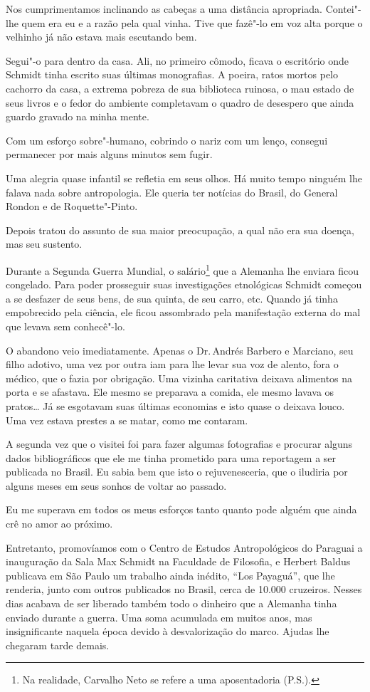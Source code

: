 {Nos cumprimentamos inclinando as cabeças a uma distância apropriada.
Contei"-lhe quem era eu e a razão pela qual vinha. Tive que fazê"-lo em
voz alta porque o velhinho já não estava mais escutando bem.

Segui"-o para dentro da casa. Ali, no primeiro cômodo, ficava o
escritório onde Schmidt tinha escrito suas últimas monografias. A
poeira, ratos mortos pelo cachorro da casa, a extrema pobreza de sua
biblioteca ruinosa, o mau estado de seus livros e o fedor do ambiente
completavam o quadro de desespero que ainda guardo gravado na minha
mente.

Com um esforço sobre"-humano, cobrindo o nariz com um lenço, consegui
permanecer por mais alguns minutos sem fugir.

Uma alegria quase infantil se refletia em seus olhos. Há muito tempo
ninguém lhe falava nada sobre antropologia. Ele queria ter notícias do
Brasil, do General Rondon e de Roquette"-Pinto.

Depois tratou do assunto de sua maior preocupação, a qual não era sua
doença, mas seu sustento.

Durante a Segunda Guerra Mundial, o salário\footnote{Na realidade,
  Carvalho Neto se refere a uma aposentadoria (P.S.).} que a Alemanha
lhe enviara ficou congelado. Para poder prosseguir suas investigações
etnológicas Schmidt começou a se desfazer de seus bens, de sua quinta,
de seu carro, etc. Quando já tinha empobrecido pela ciência, ele ficou
assombrado pela manifestação externa do mal que levava sem conhecê"-lo.

O abandono veio imediatamente. Apenas o Dr.\,Andrés Barbero e Marciano,
seu filho adotivo, uma vez por outra iam para lhe levar sua voz de
alento, fora o médico, que o fazia por obrigação. Uma vizinha caritativa
deixava alimentos na porta e se afastava. Ele mesmo se preparava a
comida, ele mesmo lavava os pratos\ldots{} Já se esgotavam suas últimas
economias e isto quase o deixava louco. Uma vez estava prestes a se
matar, como me contaram.

A segunda vez que o visitei foi para fazer algumas fotografias e
procurar alguns dados bibliográficos que ele me tinha prometido para uma
reportagem a ser publicada no Brasil. Eu sabia bem que isto o
rejuvenesceria, que o iludiria por alguns meses em seus sonhos de voltar
ao passado.

Eu me superava em todos os meus esforços tanto quanto pode alguém que
ainda crê no amor ao próximo.

Entretanto, promovíamos com o Centro de Estudos Antropológicos do
Paraguai a inauguração da Sala Max Schmidt na Faculdade de Filosofia, e
Herbert Baldus publicava em São Paulo um trabalho ainda inédito, ``Los
Payaguá'', que lhe renderia, junto com outros publicados no Brasil,
cerca de 10.000 cruzeiros. Nesses dias acabava de ser liberado também
todo o dinheiro que a Alemanha tinha enviado durante a guerra. Uma soma
acumulada em muitos anos, mas insignificante naquela época devido à
desvalorização do marco. Ajudas lhe chegaram tarde demais.

}
